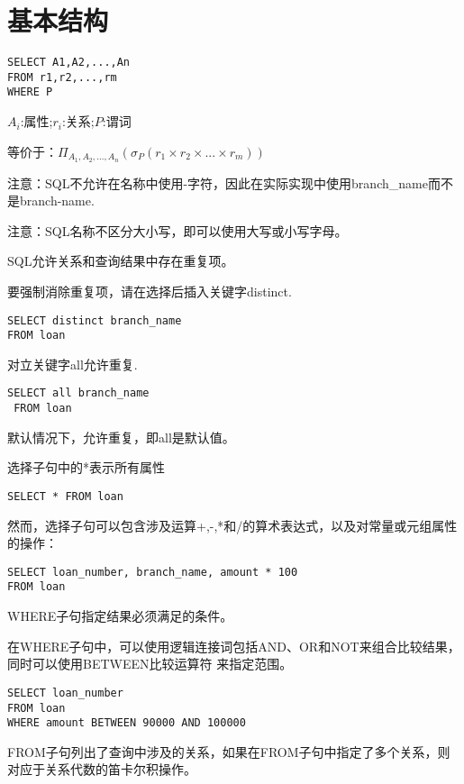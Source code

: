 \section{基本结构}

\begin{lstlisting}[style=sqlstyle]
SELECT A1,A2,...,An
FROM r1,r2,...,rm
WHERE P    
\end{lstlisting}

$A_i$:属性;$r_i$:关系;$P$:谓词

等价于：$\Pi_{A_1,A_2,...,A_n}(\sigma_P(r_1\times r_2\times ...\times r_m))$

注意：SQL不允许在名称中使用-字符，因此在实际实现中使用branch\_name而不是branch-name.

注意：SQL名称不区分大小写，即可以使用大写或小写字母。

SQL允许关系和查询结果中存在重复项。

要强制消除重复项，请在选择后插入关键字distinct.
\begin{lstlisting}[style=sqlstyle]
SELECT distinct branch_name
FROM loan    
\end{lstlisting}

对立关键字all允许重复.
\begin{lstlisting}[style=sqlstyle]
 SELECT all branch_name
 FROM loan   
\end{lstlisting}

默认情况下，允许重复，即all是默认值。

选择子句中的*表示所有属性
\begin{lstlisting}[style=sqlstyle]
SELECT * FROM loan    
\end{lstlisting}

然而，选择子句可以包含涉及运算+,-,*和/的算术表达式，以及对常量或元组属性的操作：
\begin{lstlisting}[style=sqlstyle]
SELECT loan_number, branch_name, amount * 100
FROM loan    
\end{lstlisting}

WHERE子句指定结果必须满足的条件。

在WHERE子句中，可以使用逻辑连接词包括AND、OR和NOT来组合比较结果，同时可以使用BETWEEN比较运算符
来指定范围。
\begin{lstlisting}[style=sqlstyle]
SELECT loan_number
FROM loan
WHERE amount BETWEEN 90000 AND 100000    
\end{lstlisting}

FROM子句列出了查询中涉及的关系，如果在FROM子句中指定了多个关系，则对应于关系代数的笛卡尔积操作。

